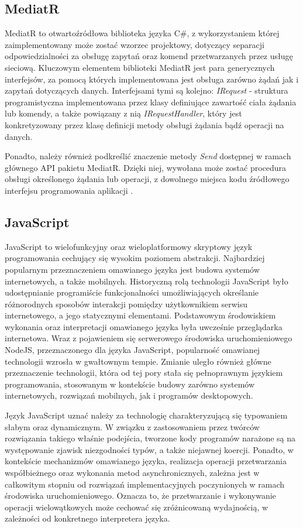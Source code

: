 \subsection*{MediatR}
MediatR to otwartoźródłowa biblioteka języka C\#, z wykorzystaniem której zaimplementowany może zostać wzorzec projektowy, dotyczący separacji odpowiedzialności za obsługę zapytań oraz komend przetwarzanych przez usługę sieciową. Kluczowym elementem biblioteki MediatR jest para generycznych interfejsów, za pomocą których implementowana jest obsługa zarówno żądań jak i zapytań dotyczących danych. Interfejsami tymi są kolejno: \textit{IRequest} - struktura programistyczna implementowana przez klasy definiujące zawartość ciała żądania lub komendy, a także powiązany z nią \textit{IRequestHandler}, który jest konkretyzowany przez klasę definicji metody obsługi żądania bądź operacji na danych. 

Ponadto, należy również podkreślić znaczenie metody \textit{Send} dostępnej w ramach głównego API pakietu MediatR. Dzięki niej, wywołana może zostać procedura obsługi określonego żądania lub operacji, z dowolnego miejsca kodu źródłowego interfejsu programowania aplikacji \cite{mediatr}.
\subsection*{JavaScript}
JavaScript to wielofunkcyjny oraz wieloplatformowy skryptowy język programowania cechujący się wysokim poziomem abstrakcji. Najbardziej popularnym przeznaczeniem omawianego języka jest budowa systemów internetowych, a także mobilnych. Historyczną rolą technologii JavaScript było udostępnianie programiście funkcjonalności umożliwiających określanie różnorodnych sposobów interakcji pomiędzy użytkownikiem serwisu internetowego, a jego statycznymi elementami. Podstawowym środowiskiem wykonania oraz interpretacji omawianego języka była uwcześnie przeglądarka internetowa. Wraz z pojawieniem się serwerowego środowiska uruchomieniowego NodeJS, przeznaczonego dla języka JavaScript, popularność omawianej technologii wzrosła w gwałtownym tempie. Zmianie uległo również główne przeznaczenie technologii, która od tej pory stała się pełnoprawnym językiem programowania, stosowanym w kontekście budowy zarówno systemów internetowych, rozwiązań mobilnych, jak i programów desktopowych.

Język JavaScript uznać należy za technologię charakteryzującą się typowaniem słabym oraz dynamicznym. W związku z zastosowaniem przez twórców rozwiązania takiego właśnie podejścia, tworzone kody programów narażone są na występowanie zjawisk niezgodności typów, a także niejawnej koercji. Ponadto, w kontekście mechanizmów omawianego języka, realizacja operacji przetwarzania współbieżnego oraz wykonania metod asynchronicznych, zależna jest w całkowitym stopniu od rozwiązań implementacyjnych poczynionych w ramach środowiska uruchomieniowego. Oznacza to, że przetwarzanie i wykonywanie operacji wielowątkowych może cechować się zróżnicowaną wydajnością, w zależności od konkretnego interpretera języka.  

